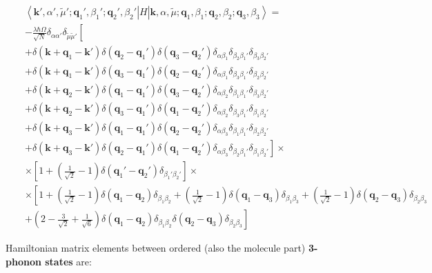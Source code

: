 \documentclass[pt12]{article}
\newcommand{\bfk}{\mathbf{k}}
\newcommand{\bfq}{\mathbf{q}}
\newcommand{\tmu}{\tilde{\mu}}
\begin{document}
\begin{eqnarray}\label{4P_H_3P}
&& \left< \bfk',\alpha',\tmu'; \bfq_1',\beta_1'; \bfq_2',\beta_2'
\right| H \left|\bfk,\alpha,\tmu; \bfq_1,\beta_1 ;
\bfq_2,\beta_2; \bfq_3,\beta_3 \right> = \\
\nonumber &&
-\frac{\lambda\hbar\Omega}{\sqrt{N}}\delta_{\alpha\alpha'}
\delta_{\tmu\tmu'} \left[ \right. \\
\nonumber && +
\delta(\bfk+\bfq_1-\bfk')\delta(\bfq_2-\bfq_1')\delta(\bfq_3-\bfq_2')
\delta_{\alpha\beta_1}\delta_{\beta_2\beta_1'}\delta_{\beta_3\beta_2'}
\\ \nonumber && +
\delta(\bfk+\bfq_1-\bfk')\delta(\bfq_3-\bfq_1')\delta(\bfq_2-\bfq_2')
\delta_{\alpha\beta_1}\delta_{\beta_3\beta_1'}\delta_{\beta_2\beta_2'}
\\ \nonumber && +
\delta(\bfk+\bfq_2-\bfk')\delta(\bfq_1-\bfq_1')\delta(\bfq_3-\bfq_2')
\delta_{\alpha\beta_2}\delta_{\beta_1\beta_1'}\delta_{\beta_3\beta_2'}
\\ \nonumber && +
\delta(\bfk+\bfq_2-\bfk')\delta(\bfq_3-\bfq_1')\delta(\bfq_1-\bfq_2')
\delta_{\alpha\beta_2}\delta_{\beta_3\beta_1'}\delta_{\beta_1\beta_2'}
\\ \nonumber && +
\delta(\bfk+\bfq_3-\bfk')\delta(\bfq_1-\bfq_1')\delta(\bfq_2-\bfq_2')
\delta_{\alpha\beta_3}\delta_{\beta_1\beta_1'}\delta_{\beta_2\beta_2'}
\\ \nonumber && +
\delta(\bfk+\bfq_3-\bfk')\delta(\bfq_2-\bfq_1')\delta(\bfq_1-\bfq_2')
\delta_{\alpha\beta_3}\delta_{\beta_2\beta_1'}\delta_{\beta_1\beta_2'}
\left.\right]\times
\\ \nonumber && \times
\left[1+\left(\frac{1}{\sqrt{2}}-1\right)\delta(\bfq_1'-\bfq_2')
\delta_{\beta_1'\beta_2'}\right] \times
\\ \nonumber && \times
\left[1+\left(\frac{1}{\sqrt{2}}-1\right)\delta(\bfq_1-\bfq_2)
\delta_{\beta_1\beta_2}+\left(\frac{1}{\sqrt{2}}-1\right)\delta(\bfq_1-\bfq_3)
\delta_{\beta_1\beta_3}+
\left(\frac{1}{\sqrt{2}}-1\right)\delta(\bfq_2-\bfq_3)
\delta_{\beta_2\beta_3}\right.
\\ \nonumber && +
\left(2-\frac{3}{\sqrt{2}}+\frac{1}{\sqrt{6}}\right)\delta(\bfq_1-\bfq_2)
\delta_{\beta_1\beta_2}\delta(\bfq_2-\bfq_3) \delta_{\beta_2\beta_3}
\left.\right]
\end{eqnarray}

Hamiltonian matrix elements between ordered (also the molecule part)
\textbf{3-phonon states} are:
\end{document}
